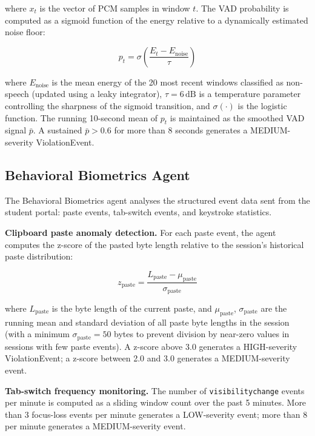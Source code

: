 where $x_t$ is the vector of PCM samples in window $t$. The VAD probability is computed as a sigmoid function of the energy relative to a dynamically estimated noise floor:

\begin{equation}
    p_t = \sigma\left(\frac{E_t - E_{\text{noise}}}{\tau}\right)
    \label{eq:vad_prob}
\end{equation}

where $E_{\text{noise}}$ is the mean energy of the 20 most recent windows classified as non-speech (updated using a leaky integrator), $\tau = 6\,\text{dB}$ is a temperature parameter controlling the sharpness of the sigmoid transition, and $\sigma(\cdot)$ is the logistic function. The running 10-second mean of $p_t$ is maintained as the smoothed VAD signal $\bar{p}$. A sustained $\bar{p} > 0.6$ for more than 8 seconds generates a MEDIUM-severity ViolationEvent.

\subsection{Behavioral Biometrics Agent}

The Behavioral Biometrics agent analyses the structured event data sent from the student portal: paste events, tab-switch events, and keystroke statistics.

\textbf{Clipboard paste anomaly detection.} For each paste event, the agent computes the z-score of the pasted byte length relative to the session's historical paste distribution:

\begin{equation}
    z_{\text{paste}} = \frac{L_{\text{paste}} - \mu_{\text{paste}}}{\sigma_{\text{paste}}}
    \label{eq:paste_zscore}
\end{equation}

where $L_{\text{paste}}$ is the byte length of the current paste, and $\mu_{\text{paste}}$, $\sigma_{\text{paste}}$ are the running mean and standard deviation of all paste byte lengths in the session (with a minimum $\sigma_{\text{paste}} = 50$ bytes to prevent division by near-zero values in sessions with few paste events). A z-score above 3.0 generates a HIGH-severity ViolationEvent; a z-score between 2.0 and 3.0 generates a MEDIUM-severity event.

\textbf{Tab-switch frequency monitoring.} The number of \texttt{visibilitychange} events per minute is computed as a sliding window count over the past 5 minutes. More than 3 focus-loss events per minute generates a LOW-severity event; more than 8 per minute generates a MEDIUM-severity event.

